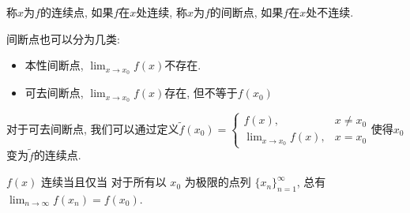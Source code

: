 \begin{definition}
    称$x$为$f$的连续点, 如果$f$在$x$处连续, 称$x$为$f$的间断点, 如果$f$在$x$处不连续.

    间断点也可以分为几类: 
    \begin{itemize}
        \item 本性间断点, $\displaystyle \lim_{x \to x_0} f\left( x \right) $不存在.
        \item 可去间断点, $\displaystyle \lim_{x \to x_0} f\left( x \right) $存在, 但不等于$f \left( x_0 \right) $
    \end{itemize}
\end{definition}
对于可去间断点, 我们可以通过定义$\tilde{f} \left( x_0 \right) = \begin{cases} 
  f \left( x \right) , & x \neq x_0 
  \\ 
  \lim_{x \to x_0} f\left( x \right), & x = x_0 
\end{cases} $使得$x_0$变为$\tilde{f}$的连续点.

\begin{proposition}[用序列极限刻画函数连续]
    $f\left( x \right) $ 连续当且仅当
    对于所有以 $x_0$ 为极限的点列 $\{ x_n \}_{n=1}^{\infty}$, 总有 $\displaystyle \lim_{n \to \infty} f\left( x_n \right) = f \left( x_0 \right) $.
\end{proposition}


